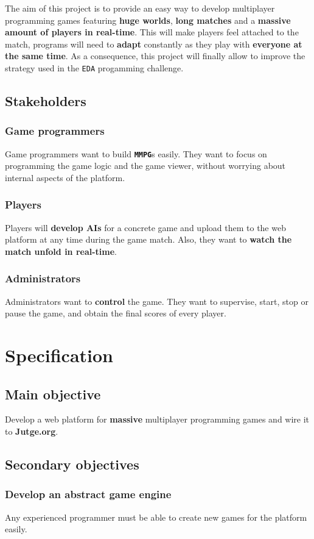 \documentclass[a4paper,11pt,titlepage,abstract,numbers=noenddot,automark,mnsy,intlimits,rgb,dvipsnames]{report}
\begin{document}
The aim of this project is to provide an easy way to develop multiplayer programming games featuring \textbf{huge worlds},
\textbf{long matches} and a \textbf{massive amount of players in real-time}. This will make players feel attached to the match,
programs will need to \textbf{adapt} constantly as they play with \textbf{everyone at the same time}. As a consequence, this project will
finally allow to improve the strategy used in the \texttt{EDA} progamming challenge.
\section{Stakeholders}
\subsection{Game programmers}
Game programmers want to build \textbf{\texttt{MMPG}}s easily. They want to focus on programming the game logic and the
game viewer, without worrying about internal aspects of the platform.
\subsection{Players}
Players will \textbf{develop \texttt{}AI\texttt{}s} for a concrete game and upload them to the web platform at any time during the game match.
Also, they want to \textbf{watch the match unfold in real-time}.
\subsection{Administrators}
Administrators want to \textbf{control} the game. They want to supervise, start,
stop or pause the game, and obtain the final scores of every player.
\clearpage
\chapter{Specification}
\section{Main objective}
Develop a web platform for \textbf{massive} multiplayer programming games and wire it to \textbf{Jutge.org}.
\section{Secondary objectives}
\subsection{Develop an abstract game engine}
Any experienced programmer must be able to create new games for the platform easily.
\end{document}
